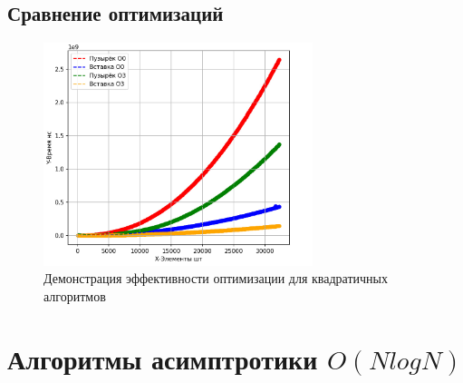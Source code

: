 \documentclass[a4paper,12pt]{article} %
\begin{document}
\subsection{Сравнение оптимизаций}
\begin{figure}[H]
    \centering
    \includegraphics[width=0.7\textwidth]{img/first/optimO2.jpg}
    \caption{Демонстрация эффективности оптимизации для квадратичных алгоритмов}
\end{figure} 
\section{Алгоритмы асимптротики $O(NlogN)$}
\end{document}
